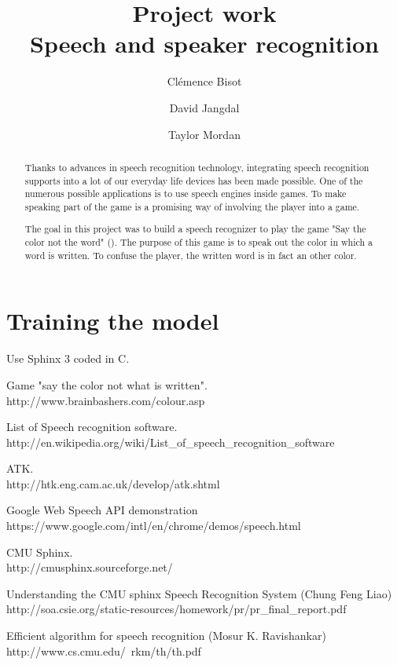 \documentclass{report}
\begin{document}
\title{Project work \\ Speech and speaker recognition}
\author{Cl\'{e}mence Bisot \and David Jangdal \and Taylor Mordan}
\maketitle

\begin{abstract}
Thanks to advances in speech recognition technology, integrating speech recognition supports into a lot of our everyday life devices has been made possible. One of the numerous possible applications is to use speech engines inside games. To make speaking part of the game is a promising way of involving the player into a game. 

The goal in this project was to build a speech recognizer to play the game "Say the color not the word" (\cite{game_site}). The purpose of this game is to speak out the color in which a word is written. To confuse the player, the written word is in fact an other color. 


\end{abstract}




\section*{Training the model}
Use Sphinx 3 coded in C. 

\begin{thebibliography}{40}
 Game "say the color not what is written". \\ http://www.brainbashers.com/colour.asp

 List of Speech recognition software. \\ http://en.wikipedia.org/wiki/List\_of\_speech\_recognition\_software

 ATK. \\ http://htk.eng.cam.ac.uk/develop/atk.shtml

 Google Web Speech API demonstration \\ https://www.google.com/intl/en/chrome/demos/speech.html

 CMU Sphinx. \\ http://cmusphinx.sourceforge.net/

 Understanding the CMU sphinx Speech Recognition System (Chung Feng Liao) \\ http://soa.csie.org/static-resources/homework/pr/pr\_final\_report.pdf

 Efficient algorithm for speech recognition (Mosur K. Ravishankar) \\ http://www.cs.cmu.edu/~rkm/th/th.pdf
\end{thebibliography}
\end{document}
